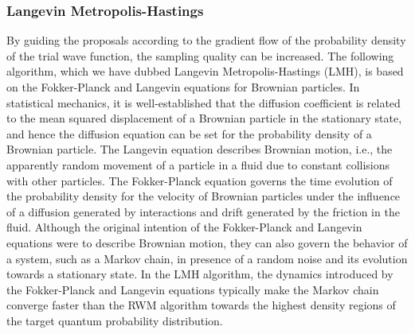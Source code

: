 
\subsubsection{Langevin Metropolis-Hastings}\label{sec:lmh}

By guiding the proposals according to the gradient flow of the probability density of the trial wave function, the sampling quality can be increased. The following algorithm, which we have dubbed Langevin Metropolis-Hastings (LMH), is based on the Fokker-Planck and Langevin equations for Brownian particles. In statistical mechanics, it is well-established that the diffusion coefficient is related to the mean squared displacement of a Brownian particle in the stationary state, and hence the diffusion equation can be set for the probability density of a Brownian particle. The Langevin equation describes Brownian motion, i.e., the apparently random movement of a particle in a fluid due to constant collisions with other particles. The Fokker-Planck equation governs the time evolution of the probability density for the velocity of Brownian particles under the influence of a diffusion generated by interactions and drift generated by the friction in the fluid. Although the original intention of the Fokker-Planck and Langevin equations were to describe Brownian motion, they can also govern the behavior of a system, such as a Markov chain, in presence of a random noise and its evolution towards a stationary state. In the LMH algorithm, the dynamics introduced by the Fokker-Planck and Langevin equations typically make the Markov chain converge faster than the RWM algorithm towards the highest density regions of the target quantum probability distribution.


